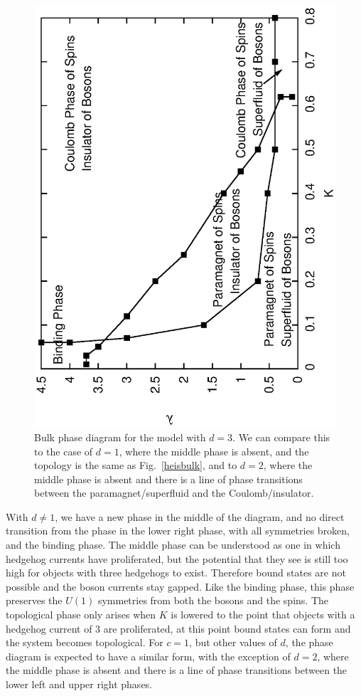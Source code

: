 \documentclass[prb,twocolumn]{revtex4-1}
\begin{document}
\begin{figure}
\includegraphics[angle=-90,width=0.9\linewidth]{figures/fracphase.eps}
\caption{Bulk phase diagram for the model with $d=3$. We can compare this to the case of $d=1$, where the middle phase is absent, and the topology is the same as Fig.~\ref{heisbulk}, and to $d=2$, where the middle phase is absent and there is a line of phase transitions between the paramagnet/superfluid and the Coulomb/insulator.}
\label{fracphase}
\end{figure}

 With $d\neq 1$, we have a new phase in the middle of the diagram, and no direct transition from the phase in the lower right phase, with all symmetries broken, and the binding phase. The middle phase can be understood as one in which hedgehog currents have proliferated, but the potential that they see is still too high for objects with three hedgehogs to exist. Therefore bound states are not possible and the boson currents stay gapped. Like the binding phase, this phase preserves the $U(1)$ symmetries from both the bosons and the spins. The topological phase only arises when $K$ is lowered to the point that objects with a hedgehog current of $3$ are proliferated, at this point bound states can form and the system becomes topological. For $c=1$, but other values of $d$, the phase diagram is expected to have a similar form, with the exception of $d=2$, where the middle phase is absent and there is a line of phase transitions between the lower left and upper right phases. 
\end{document}
